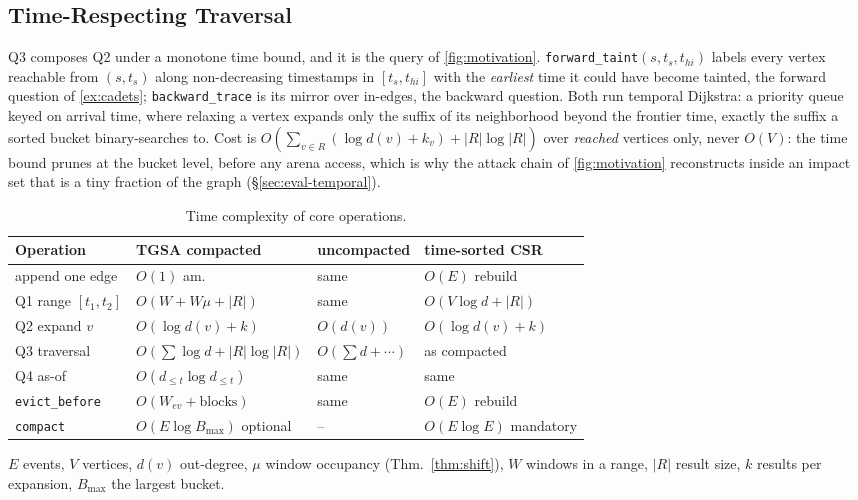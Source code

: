 \documentclass[sigconf,nonacm]{acmart}
\newcommand{\sys}{TGSA\xspace}
\begin{document}
\subsection{Time-Respecting Traversal}\label{sec:query-traverse}
Q3 composes Q2 under a monotone time bound, and it is the query of
\cref{fig:motivation}. \texttt{forward\_taint}$(s, t_s, t_{hi})$
labels every vertex reachable from $(s,t_s)$ along non-decreasing
timestamps in $[t_s,t_{hi}]$ with the \emph{earliest} time it could
have become tainted, the forward question of \cref{ex:cadets};
\texttt{backward\_trace} is its mirror over in-edges, the backward
question. Both run temporal Dijkstra: a priority queue keyed on
arrival time, where relaxing a vertex expands only the suffix of its
neighborhood beyond the frontier time, exactly the suffix a sorted
bucket binary-searches to. Cost is $O(\sum_{v \in R}(\log d(v) + k_v)
+ |R|\log|R|)$ over \emph{reached} vertices only, never $O(V)$: the
time bound prunes at the bucket level, before any arena access, which
is why the attack chain of \cref{fig:motivation} reconstructs inside
an impact set that is a tiny fraction of the graph
(\S\ref{sec:eval-temporal}).

\begin{table}[t]
\caption{\small Time complexity of core operations.}
\label{tab:complexity}
\scriptsize
\setlength{\tabcolsep}{2.5pt}
\begin{tabular}{@{}llll@{}}
\toprule
Operation & \sys compacted & uncompacted & time-sorted CSR \\
\midrule
append one edge      & $O(1)$ am.                 & same        & $O(E)$ rebuild \\
Q1 range $[t_1,t_2]$ & $O(W+W\mu+|R|)$            & same        & $O(V\log d+|R|)$ \\
Q2 expand $v$        & $O(\log d(v)+k)$           & $O(d(v))$   & $O(\log d(v)+k)$ \\
Q3 traversal         & $O(\sum\log d+|R|\log|R|)$ & $O(\sum d+\cdots)$ & as compacted \\
Q4 as-of             & $O(d_{\le t}\log d_{\le t})$ & same      & same \\
\texttt{evict\_before} & $O(W_{ev}+\text{blocks})$ & same       & $O(E)$ rebuild \\
\texttt{compact}     & $O(E\log B_{\max})$ optional & --         & $O(E\log E)$ mandatory \\
\bottomrule
\end{tabular}
\par\smallskip\scriptsize
$E$ events, $V$ vertices, $d(v)$ out-degree, $\mu$ window occupancy
(Thm.~\ref{thm:shift}), $W$ windows in a range, $|R|$ result size, $k$
results per expansion, $B_{\max}$ the largest bucket.
\end{table}
\end{document}
